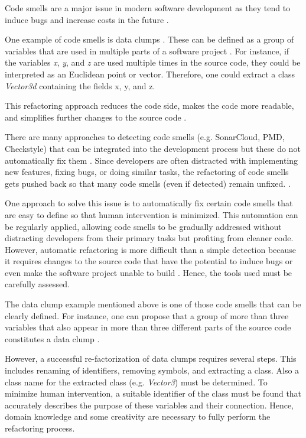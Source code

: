 \label{sec:introduction}
Code smells are a major issue  in modern software development as they tend to induce bugs and increase costs in the future \cite{mealyEvaluatingSoftwareRefactoring2006}.

One example of code smells is data clumps \cite{BaumgartnerAP23}. These can be defined as a group of variables that are used in multiple parts of a software project \cite{fowler2019refactoring}. For instance, if the variables \textit{x}, \textit{y}, and \textit{z} are used multiple times in the source code, they could be interpreted as an Euclidean point or vector. Therefore, one could extract  a class \textit{Vector3d} containing the fields x, y, and z. 

This refactoring approach reduces the code side, makes the code more readable, and simplifies further changes to the source code \cite{data_clumps_refactoring_guru} \cite{join_data_items}. 

There are many approaches to detecting code smells (e.g. SonarCloud,  PMD, Checkstyle) that can be integrated into the development process but these do not automatically fix them  \cite{vidalApproachPrioritizeCode2016}. 
Since developers are often distracted with implementing new features, fixing bugs, or doing similar tasks, the refactoring of code smells gets pushed back so that many code smells (even if detected) remain unfixed.  \cite{10.1145/2393596.2393655}.


One approach to solve this issue is to automatically fix certain code smells that are easy to define so that human intervention is minimized. This automation can be regularly applied, allowing code smells to be gradually addressed without distracting developers from their primary tasks but profiting from cleaner code. 
However,  automatic refactoring  is more difficult than a simple detection because it requires changes to the source code that have the potential to induce bugs or even make the software project unable to build \cite{9796303}. Hence, the tools used must be carefully assessed. 

The data clump example mentioned above is one of those code smells that can be clearly defined. For instance, one can propose that a group of more than three variables that also appear in more than three different parts of the source code constitutes a data clump \cite{zhangImprovingPrecisionFowler2008}.




However, a successful re-factorization of data clumps requires several steps. This includes renaming of identifiers, removing symbols, and extracting a class. Also a class name for the extracted class (e.g. \textit{Vector3}) must be determined. To minimize human intervention, a suitable identifier of the class must be found that accurately describes the purpose of these variables and their connection. Hence, domain knowledge and some creativity are necessary to fully perform the refactoring process.

